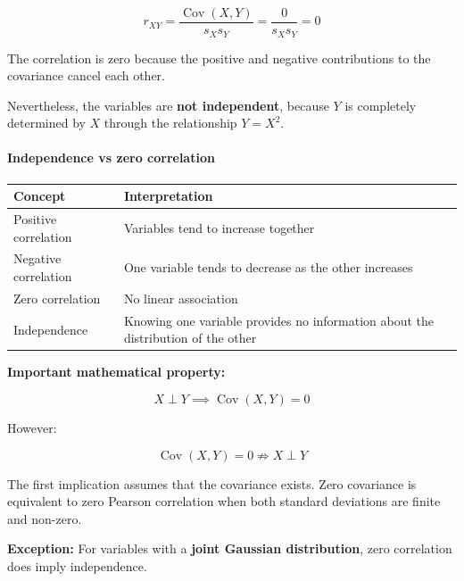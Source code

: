 \documentclass[11pt]{article}
\begin{document}
\[
r_{XY}=\frac{\operatorname{Cov}(X,Y)}{s_Xs_Y}
=\frac{0}{s_Xs_Y}
=\boxed{0}
\]

The correlation is zero because the positive and negative contributions
to the covariance cancel each other.

Nevertheless, the variables are \textbf{not independent}, because \(Y\)
is completely determined by \(X\) through the relationship \(Y=X^2\).

\paragraph{Independence vs zero
correlation}\label{independence-vs-zero-correlation}

{\def\LTcaptype{none} %
\begin{longtable}[]{@{}
  >{\raggedright\arraybackslash}p{}
  >{\raggedright\arraybackslash}p{}@{}}
\toprule\noalign{}
\begin{minipage}[b]{\linewidth}\raggedright
Concept
\end{minipage} & \begin{minipage}[b]{\linewidth}\raggedright
Interpretation
\end{minipage} \\
\midrule\noalign{}
\endhead
\bottomrule\noalign{}
\endlastfoot
Positive correlation & Variables tend to increase together \\
Negative correlation & One variable tends to decrease as the other
increases \\
Zero correlation & No linear association \\
Independence & Knowing one variable provides no information about the
distribution of the other \\
\end{longtable}
}

\textbf{Important mathematical property:}

\[
X\perp Y \implies \operatorname{Cov}(X,Y)=0
\]

However:

\[
\operatorname{Cov}(X,Y)=0 \not\Longrightarrow X\perp Y
\]

The first implication assumes that the covariance exists. Zero
covariance is equivalent to zero Pearson correlation when both standard
deviations are finite and non-zero.

\textbf{Exception:} For variables with a \textbf{joint Gaussian
distribution}, zero correlation does imply independence.
\end{document}
